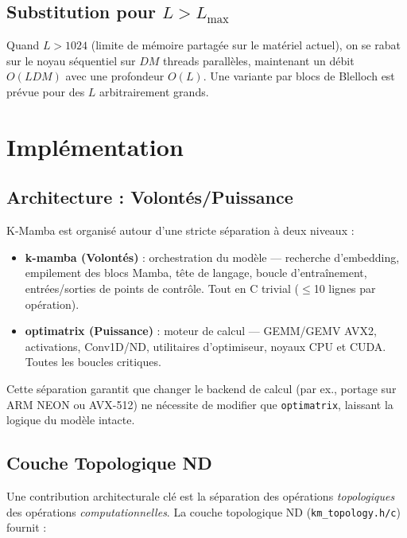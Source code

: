 \documentclass[10pt,onecolumn]{article}
\begin{document}
\subsection{Substitution pour $L > L_{\max}$}

Quand $L > 1024$ (limite de mémoire partagée sur le matériel actuel), on se rabat
sur le noyau séquentiel sur $DM$ threads parallèles, maintenant un débit
$O(LDM)$ avec une profondeur $O(L)$. Une variante par blocs de Blelloch
est prévue pour des $L$ arbitrairement grands.

\section{Implémentation}
\label{sec:implementation}

\subsection{Architecture : Volontés/Puissance}

K-Mamba est organisé autour d'une stricte séparation à deux niveaux :

\begin{itemize}
  \item \textbf{k-mamba (Volontés)} : orchestration du modèle —
        recherche d'embedding, empilement des blocs Mamba, tête de langage,
        boucle d'entraînement, entrées/sorties de points de contrôle.
        Tout en C trivial ($\leq$10 lignes par opération).
  \item \textbf{optimatrix (Puissance)} : moteur de calcul —
        GEMM/GEMV AVX2, activations, Conv1D/ND, utilitaires d'optimiseur,
        noyaux CPU et CUDA. Toutes les boucles critiques.
\end{itemize}

Cette séparation garantit que changer le backend de calcul (par ex., portage
sur ARM NEON ou AVX-512) ne nécessite de modifier que \texttt{optimatrix},
laissant la logique du modèle intacte.

\subsection{Couche Topologique ND}

Une contribution architecturale clé est la séparation des opérations
\emph{topologiques} des opérations \emph{computationnelles}. La couche
topologique ND (\texttt{km\_topology.h/c}) fournit :
\end{document}
